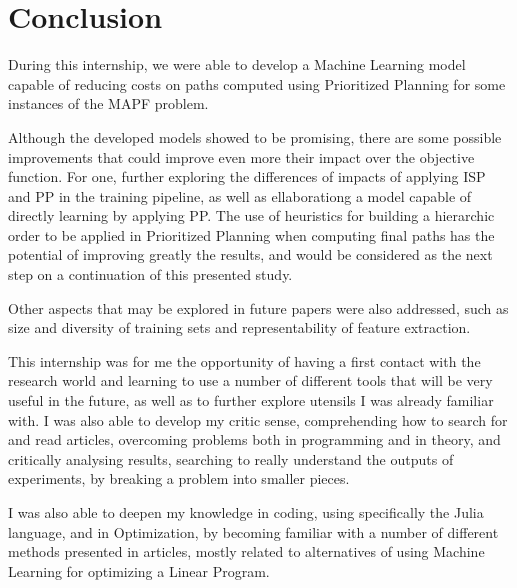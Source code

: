\section{Conclusion}

During this internship, we were able to develop a Machine Learning model capable of reducing costs on paths computed using Prioritized Planning for some instances of the MAPF problem.

Although the developed models showed to be promising, there are some possible improvements that could improve even more their impact over the objective function. For one, further exploring the differences of impacts of applying ISP and PP in the training pipeline, as well as ellaborationg a model capable of directly learning by applying PP. The use of heuristics for building a hierarchic order to be applied in Prioritized Planning when computing final paths has the potential of improving greatly the results, and would be considered as the next step on a continuation of this presented study.

Other aspects that may be explored in future papers were also addressed, such as size and diversity of training sets and representability of feature extraction.

This internship was for me the opportunity of having a first contact with the research world and learning to use a number of different tools that will be very useful in the future, as well as to further explore utensils I was already familiar with. I was also able to develop my critic sense, comprehending how to search for and read articles, overcoming problems both in programming and in theory, and critically analysing results, searching to really understand the outputs of experiments, by breaking a problem into smaller pieces.

I was also able to deepen my knowledge in coding, using specifically the Julia language, and in Optimization, by becoming familiar with a number of different methods presented in articles, mostly related to alternatives of using Machine Learning for optimizing a Linear Program.
